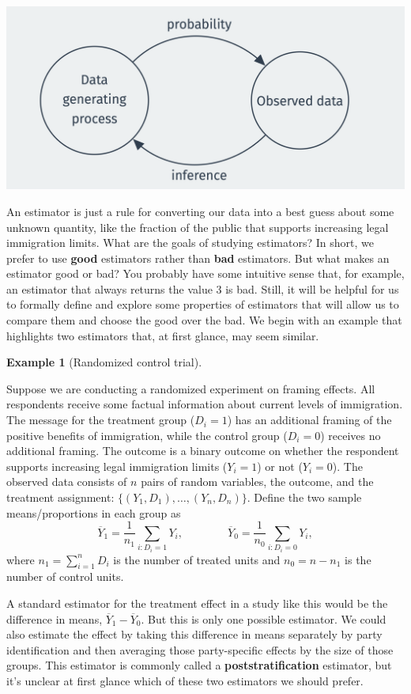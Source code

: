 \documentclass[
  letterpaper,
  DIV=11,
  numbers=noendperiod]{scrreprt}
\newcommand{\Ybar}{\overline{Y}}
\theoremstyle{definition}
\theoremstyle{plain}
\theoremstyle{definition}
\newtheorem{example}{Example}[chapter]
\theoremstyle{remark}
\begin{document}
\includegraphics{assets/img/two-direction.png}

An estimator is just a rule for converting our data into a best guess
about some unknown quantity, like the fraction of the public that
supports increasing legal immigration limits. What are the goals of
studying estimators? In short, we prefer to use \textbf{good} estimators
rather than \textbf{bad} estimators. But what makes an estimator good or
bad? You probably have some intuitive sense that, for example, an
estimator that always returns the value 3 is bad. Still, it will be
helpful for us to formally define and explore some properties of
estimators that will allow us to compare them and choose the good over
the bad. We begin with an example that highlights two estimators that,
at first glance, may seem similar.

\begin{example}[Randomized control
trial]\protect\hypertarget{exm-rct}{}\label{exm-rct}

Suppose we are conducting a randomized experiment on framing effects.
All respondents receive some factual information about current levels of
immigration. The message for the treatment group (\(D_i = 1\)) has an
additional framing of the positive benefits of immigration, while the
control group (\(D_i = 0\)) receives no additional framing. The outcome
is a binary outcome on whether the respondent supports increasing legal
immigration limits (\(Y_i = 1\)) or not (\(Y_i = 0\)). The observed data
consists of \(n\) pairs of random variables, the outcome, and the
treatment assignment: \(\{(Y_1, D_1), \ldots, (Y_n, D_n)\}\). Define the
two sample means/proportions in each group as \[
\Ybar_1 = \frac{1}{n_1} \sum_{i: D_i = 1} Y_i, \qquad\qquad \Ybar_0 = \frac{1}{n_0} \sum_{i: D_i = 0} Y_i,
\] where \(n_1 = \sum_{i=1}^n D_i\) is the number of treated units and
\(n_0 = n - n_1\) is the number of control units.

A standard estimator for the treatment effect in a study like this would
be the difference in means, \(\Ybar_1 - \Ybar_0\). But this is only one
possible estimator. We could also estimate the effect by taking this
difference in means separately by party identification and then
averaging those party-specific effects by the size of those groups. This
estimator is commonly called a \textbf{poststratification} estimator,
but it's unclear at first glance which of these two estimators we should
prefer.

\end{example}
\end{document}
